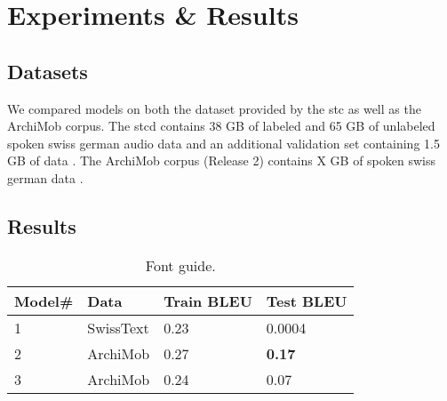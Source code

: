 \section{Experiments \& Results}

\subsection{Datasets}
We compared models on both the dataset provided by the \gls{stc} as well as the ArchiMob corpus. The \gls{stcd} contains 38 GB of labeled and 65 GB of unlabeled spoken swiss german audio data and an additional validation set
containing 1.5 GB of data \cite{stc2019}. The ArchiMob corpus (Release 2) contains X GB of spoken swiss german data \cite{archimob2016}.
\subsection{Results}

\begin{table}[H]
    \centering
    \begin{tabular}{llll}
    \hline\textbf{Model\#}    & \textbf{Data} & \textbf{Train BLEU}   & \textbf{Test BLEU} \\\hline   %
    1                   & SwissText     & 0.23                  & 0.0004                \\%
    2                   & ArchiMob      & 0.27                  & \textbf{0.17}         \\%
    3                   & ArchiMob      & 0.24                  & 0.07                  \\%
    \hline
    \end{tabular}
    \caption{\label{font-table} Font guide. }
\end{table}

